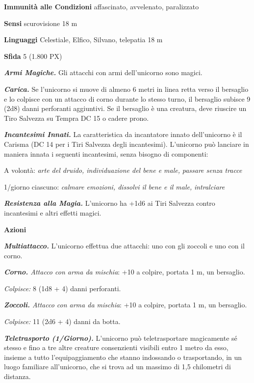 \begin{multicols}{2}
	\textbf{Immunità alle Condizioni} affascinato, avvelenato, paralizzato

	\textbf{Sensi} scurovisione 18 m

	\textbf{Linguaggi} Celestiale, Elfico, Silvano, telepatia 18 m

	\textbf{Sfida} 5 (1.800 PX)

	\textit{\textbf{Armi Magiche.}} Gli attacchi con armi dell'unicorno sono magici.

	\textit{\textbf{Carica.}} Se l'unicorno si muove di almeno 6 metri in linea retta verso il bersaglio e lo colpisce con un attacco di corno durante lo stesso turno, il bersaglio subisce 9 (2d8) danni perforanti aggiuntivi. Se il bersaglio è una creatura, deve riuscire un Tiro Salvezza su Tempra DC 15 o cadere prono.

	\textit{\textbf{Incantesimi Innati.}} La caratteristica da incantatore innato dell'unicorno è il Carisma (DC 14 per i Tiri Salvezza degli incantesimi). L'unicorno può lanciare in maniera innata i seguenti incantesimi, senza bisogno di componenti:

	A volontà: \textit{arte del druido, individuazione del bene e male,} \textit{passare senza tracce}

	1/giorno ciascuno: \textit{calmare emozioni, dissolvi il bene e il male,} \textit{intralciare}

	\textit{\textbf{Resistenza alla Magia.}} L'unicorno ha +1d6 ai Tiri Salvezza contro incantesimi e altri effetti magici.

	\textbf{Azioni}

	\textit{\textbf{Multiattacco.}} L'unicorno effettua due attacchi: uno con gli zoccoli e uno con il corno.

	\textit{\textbf{Corno.} Attacco con arma da mischia}: +10 a colpire, portata 1 m, un bersaglio.

	\textit{Colpisce:} 8 (1d8 + 4) danni perforanti.

	\textit{\textbf{Zoccoli.} Attacco con arma da mischia}: +10 a colpire, portata 1 m, un bersaglio.

	\textit{Colpisce:} 11 (2d6 + 4) danni da botta.

	\textit{\textbf{Teletrasporto (1/Giorno).}} L'unicorno può teletrasportare magicamente sé stesso e fino a tre altre creature consenzienti visibili entro 1 metro da esso, insieme a tutto l'equipaggiamento che stanno indossando o trasportando, in un luogo familiare all'unicorno, che si trova ad un massimo di 1,5 chilometri di distanza.


\end{multicols}
